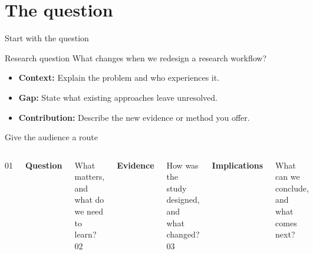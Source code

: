 \section{The question}
\begin{frame}{Start with the question}
\begin{block}{Research question}
What changes when we redesign a research workflow?
\end{block}
\vspace{4mm}
\begin{itemize}\setlength{\itemsep}{5mm}
\item \textbf{Context:} Explain the problem and who experiences it.
\item \textbf{Gap:} State what existing approaches leave unresolved.
\item \textbf{Contribution:} Describe the new evidence or method you offer.
\end{itemize}
\end{frame}

\begin{frame}{Give the audience a route}
\begin{columns}[T,onlytextwidth]
{\Huge\color{accent}01}\par\vspace{3mm}
\textbf{Question}\par\vspace{2mm}
What matters, and what do we need to learn?
{\Huge\color{accent}02}\par\vspace{3mm}
\textbf{Evidence}\par\vspace{2mm}
How was the study designed, and what changed?
{\Huge\color{accent}03}\par\vspace{3mm}
\textbf{Implications}\par\vspace{2mm}
What can we conclude, and what comes next?
\end{columns}
\end{frame}

